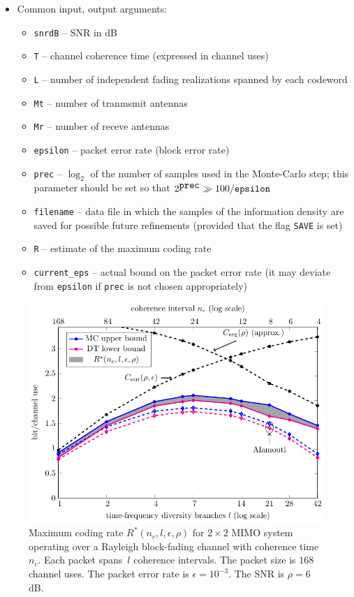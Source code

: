 \documentclass[a4paper,11p]{memoir}
\begin{document}
\begin{itemize}
  
  \item Common input, output arguments: 
  \begin{itemize}
    \item \verb|snrdB| -- SNR in dB
    \item \verb|T| -- channel coherence time (expressed in channel uses)
    \item \verb|L| -- number of independent fading realizations spanned by each codeword
    \item \verb|Mt| -- number of tranmsmit antennas
    \item \verb|Mr| -- number of receve antennas
    \item \verb|epsilon| -- packet error rate (block error rate)
    \item \verb|prec| -- $\log_2$ of the number of samples used in the Monte-Carlo step; this parameter should be set so that $2^{\verb|prec|} \gg 100 / \verb|epsilon|$
    \item \verb|filename| -- data file in which the samples of the information density are saved for possible future refinements (provided that the flag \verb|SAVE| is set)
    \item \verb|R| -- estimate of the maximum coding rate
    \item \verb|current_eps| -- actual bound on the packet error rate (it may  deviate from \verb|epsilon| if \verb|prec| is not chosen appropriately)
  \end{itemize}
  
\end{itemize}

   \begin{figure}[t]
    \centering
      \includegraphics[width=20cm]{./plots/snr6eps03M2}
    \caption{Maximum coding rate $R^\ast(n_c,l,\epsilon,\rho)$ for $2\times 2$ MIMO system operating over a Rayleigh block-fading channel with coherence time $n_c$.
    Each packet spans~$l$ coherence intervals. The packet size is $168$ channel uses. The packet error rate is $\epsilon=10^{-3}$.
    The SNR is $\rho=6$ dB.}
    \label{fig:snr6eps03M2}
  \end{figure}
  
\end{document}

